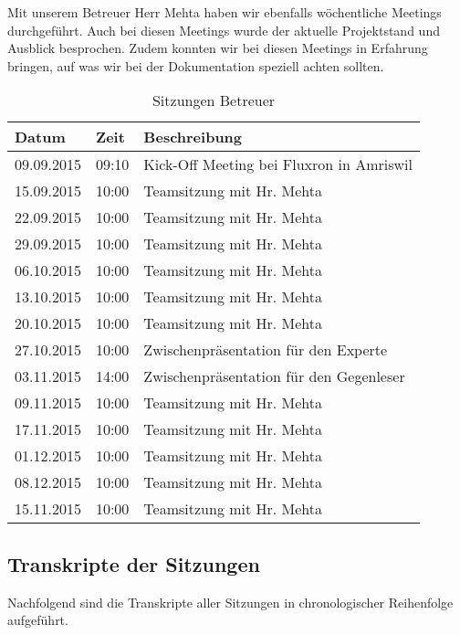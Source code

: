 Mit unserem Betreuer Herr Mehta haben wir ebenfalls wöchentliche Meetings durchgeführt. Auch bei diesen Meetings wurde der aktuelle Projektstand und Ausblick besprochen. Zudem konnten wir bei diesen Meetings in Erfahrung bringen, auf was wir bei der Dokumentation speziell achten sollten.

\begin{table}[H]
\begin{tabularx}{\textwidth}{ l | l | X}
\textbf{Datum}& \textbf{Zeit} & \textbf{Beschreibung}\\ \hline
09.09.2015 & 09:10 & Kick-Off Meeting bei Fluxron in Amriswil\\ \hline
15.09.2015 & 10:00 & Teamsitzung mit Hr. Mehta\\ \hline
22.09.2015 & 10:00 & Teamsitzung mit Hr. Mehta\\ \hline
29.09.2015 & 10:00 & Teamsitzung mit Hr. Mehta\\ \hline
06.10.2015 & 10:00 & Teamsitzung mit Hr. Mehta\\ \hline
13.10.2015 & 10:00 & Teamsitzung mit Hr. Mehta\\ \hline
20.10.2015 & 10:00 & Teamsitzung mit Hr. Mehta\\ \hline
27.10.2015 & 10:00 & Zwischenpräsentation für den Experte\\ \hline
03.11.2015 & 14:00 & Zwischenpräsentation für den Gegenleser\\ \hline
09.11.2015 & 10:00 & Teamsitzung mit Hr. Mehta\\ \hline
17.11.2015 & 10:00 & Teamsitzung mit Hr. Mehta\\ \hline
01.12.2015 & 10:00 & Teamsitzung mit Hr. Mehta\\ \hline
08.12.2015 & 10:00 & Teamsitzung mit Hr. Mehta\\ \hline
15.11.2015 & 10:00 & Teamsitzung mit Hr. Mehta\\ \hline
\end{tabularx}
\caption{Sitzungen Betreuer}
\end{table}

\subsection{Transkripte der Sitzungen}
\label{sub:sitzungs_transkripte}

Nachfolgend sind die Transkripte aller Sitzungen in chronologischer Reihenfolge aufgeführt.

